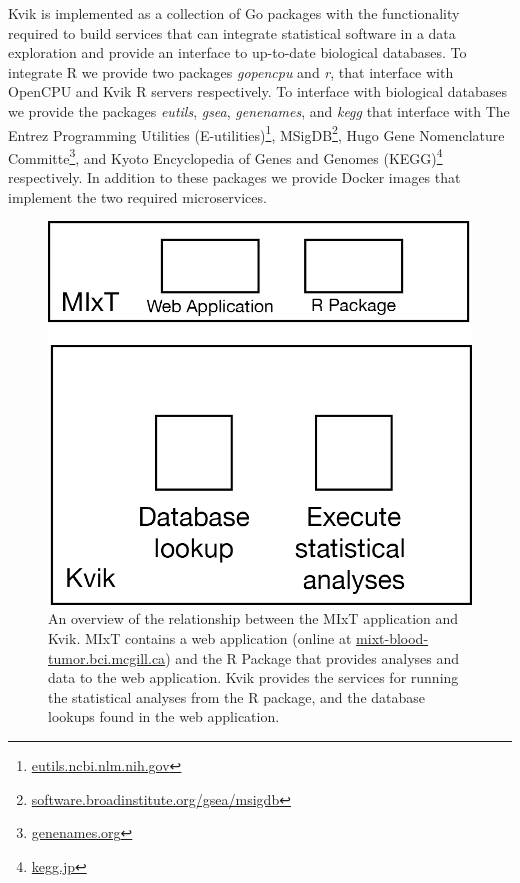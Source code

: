 Kvik is implemented as a collection of Go packages with the
functionality required to build services that can integrate statistical
software in a data exploration and provide an interface to up-to-date biological
databases. To integrate R we provide two packages \emph{gopencpu} and
\emph{r}, that interface with OpenCPU and Kvik R servers respectively. To
interface with biological databases we provide the packages \emph{eutils},
\emph{gsea}, \emph{genenames}, and \emph{kegg} that interface with
The Entrez Programming Utilities
(E-utilities)\footnote{\url{eutils.ncbi.nlm.nih.gov}},
MSigDB\footnote{\url{software.broadinstitute.org/gsea/msigdb}}, Hugo Gene
Nomenclature Committe\footnote{\url{genenames.org}}, and Kyoto Encyclopedia
of Genes and Genomes (KEGG)\footnote{\url{kegg.jp}} respectively. 
In addition to these packages we provide Docker images that implement the
two required microservices. 

% 
% 
% 
% 
% 


\begin{figure}[h!]
\centering
\includegraphics{figures/kvik-mixt.png}
\caption{An overview of the relationship between the MIxT application and Kvik.
MIxT contains a web application (online at \url{mixt-blood-tumor.bci.mcgill.ca})
and the R Package that provides analyses and data to the web application. Kvik
provides the services for running the statistical analyses from the R package,
and the database lookups found in the web application.} 
\label{kvik-mixt}
\end{figure} 


